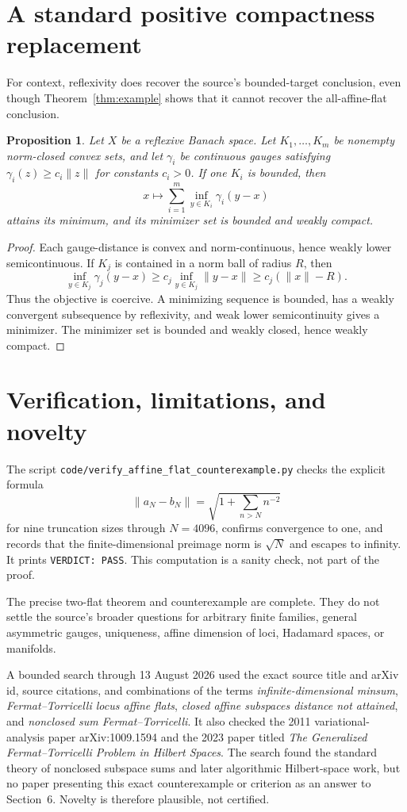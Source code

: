 \documentclass[11pt]{article}
\newtheorem{proposition}[theorem]{Proposition}
\begin{document}
\section{A standard positive compactness replacement}

For context, reflexivity does recover the source's bounded-target conclusion,
even though Theorem~\ref{thm:example} shows that it cannot recover the
all-affine-flat conclusion.

\begin{proposition}
Let $X$ be a reflexive Banach space.  Let $K_1,\ldots,K_m$ be nonempty
norm-closed convex sets, and let $\gamma_i$ be continuous gauges satisfying
$\gamma_i(z)\ge c_i\|z\|$ for constants $c_i>0$.  If one $K_i$ is bounded,
then
\[
 x\longmapsto\sum_{i=1}^m\inf_{y\in K_i}\gamma_i(y-x)
\]
attains its minimum, and its minimizer set is bounded and weakly compact.
\end{proposition}

\begin{proof}
Each gauge-distance is convex and norm-continuous, hence weakly lower
semicontinuous.  If $K_j$ is contained in a norm ball of radius $R$, then
\[
 \inf_{y\in K_j}\gamma_j(y-x)
 \ge c_j\inf_{y\in K_j}\|y-x\|
 \ge c_j(\|x\|-R).
\]
Thus the objective is coercive.  A minimizing sequence is bounded, has a
weakly convergent subsequence by reflexivity, and weak lower semicontinuity
gives a minimizer.  The minimizer set is bounded and weakly closed, hence
weakly compact.
\end{proof}

\section{Verification, limitations, and novelty}

The script \texttt{code/verify\_affine\_flat\_counterexample.py} checks the
explicit formula
\[
 \|a_N-b_N\|=\sqrt{1+\sum_{n>N}n^{-2}}
\]
for nine truncation sizes through $N=4096$, confirms convergence to one, and
records that the finite-dimensional preimage norm is $\sqrt N$ and escapes to
infinity.  It prints \texttt{VERDICT: PASS}.  This computation is a sanity
check, not part of the proof.

The precise two-flat theorem and counterexample are complete.  They do not
settle the source's broader questions for arbitrary finite families, general
asymmetric gauges, uniqueness, affine dimension of loci, Hadamard spaces, or
manifolds.

A bounded search through 13 August 2026 used the exact source title and arXiv
id, source citations, and combinations of the terms
\emph{infinite-dimensional minsum}, \emph{Fermat--Torricelli locus affine
flats}, \emph{closed affine subspaces distance not attained}, and
\emph{nonclosed sum Fermat--Torricelli}.  It also checked the 2011
variational-analysis paper arXiv:1009.1594 and the 2023 paper titled
\emph{The Generalized Fermat--Torricelli Problem in Hilbert Spaces}.  The
search found the standard theory of nonclosed subspace sums and later
algorithmic Hilbert-space work, but no paper presenting this exact
counterexample or criterion as an answer to Section~6.  Novelty is therefore
plausible, not certified.
\end{document}
